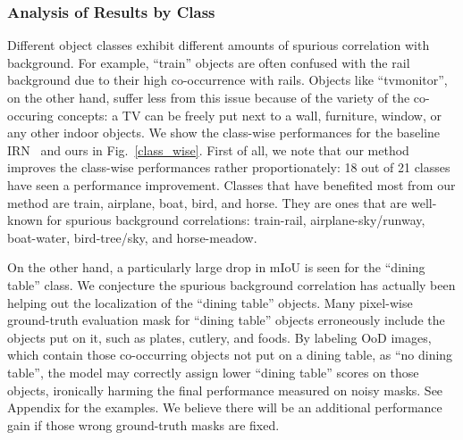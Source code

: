 \documentclass[10pt,twocolumn,letterpaper]{article}
\begin{document}
\vspace{-1em}
\subsubsection{Analysis of Results by Class}
\vspace{-0.2em}
Different object classes exhibit different amounts of spurious correlation with background. 
For example, ``train'' objects are often confused with the rail background due to their high co-occurrence with rails. 
Objects like ``tvmonitor'', on the other hand, suffer less from this issue because of the variety of the co-occuring concepts: a TV can be freely put next to a wall, furniture, window, or any other indoor objects.
We show the class-wise performances for the baseline IRN~\cite{ahn2019weakly} and ours in
Fig.~\ref{class_wise}.
First of all, we note that our method improves the class-wise performances rather proportionately: 18 out of 21 classes have seen a performance improvement.
Classes that have benefited most from our method are train, airplane, boat, bird, and horse. 
They are ones that are well-known for spurious background correlations: 
train-rail, airplane-sky/runway, boat-water, bird-tree/sky, and horse-meadow.


On the other hand, a particularly large drop in mIoU is seen for the ``dining table'' class.
We conjecture the spurious background correlation has actually been helping out the localization of the ``dining table'' objects. 
Many pixel-wise ground-truth evaluation mask for ``dining table'' objects erroneously include the objects put on it, such as plates, cutlery, and foods.
By labeling OoD images, which contain those co-occurring objects not put on a dining table, as ``no dining table'', the model may correctly assign lower ``dining table'' scores on those objects, ironically harming the final performance measured on noisy masks.
See Appendix for the examples.
We believe there will be an additional performance gain if those wrong ground-truth masks are fixed.




\vspace{-0.9em}
\end{document}
